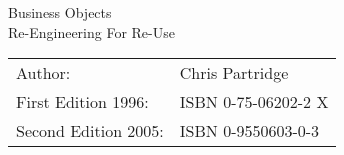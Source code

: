 

\begin{frame}{}
    Business Objects\\
    Re-Engineering For Re-Use
    \vfill
    \begin{tabular}{ll}
        Author: & Chris Partridge \\
        First Edition 1996: & ISBN 0-75-06202-2 X\\
        Second Edition 2005: & ISBN 0-9550603-0-3\\
    \end{tabular}
\end{frame}
